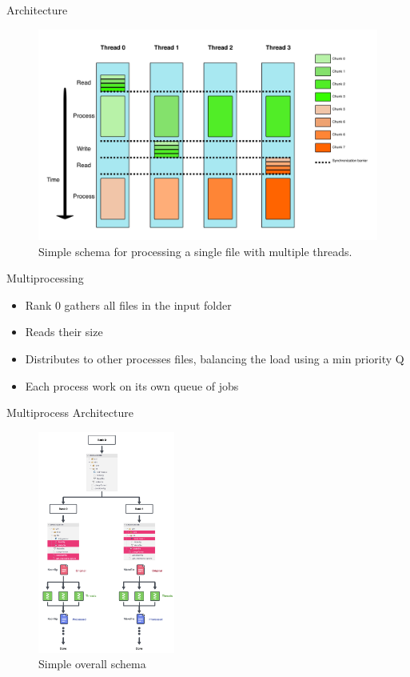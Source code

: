 \begin{frame}{Architecture}
    \begin{figure}
        \centering
        \includegraphics[width=\linewidth]{../imgs/threading}
        \caption{Simple schema for processing a single file with multiple threads.}
        \label{fig:threading}
    \end{figure}
\end{frame}
  \begin{frame}{Multiprocessing}
    \begin{itemize}
        \item Rank 0 gathers all files in the input folder
        \item Reads their size
        \item Distributes to other processes files, balancing the load using a min priority Q
        \item Each process work on its own queue of jobs 
    \end{itemize}
\end{frame}
    \begin{frame}{Multiprocess Architecture}
    \begin{figure}
        \centering
        \includegraphics[width=0.40\textwidth]{../imgs/overall flow schema.png}
        \caption{Simple overall schema}
        \label{fig:threading}
    \end{figure}
\end{frame}
